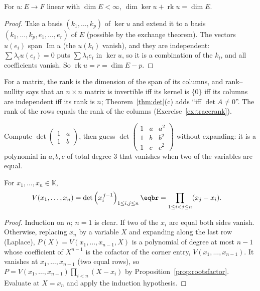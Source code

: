 \begin{proposition}\label{prop:ranknullity}
For $u:E\to F$ linear with $\dim E<\infty$, $\dim\ker u+\operatorname{rk}u=\dim E$.
\end{proposition}
\begin{proof}
Take a basis $(k_1,\dots,k_p)$ of $\ker u$ and extend it to a basis $(k_1,\dots,k_p,e_1,\dots,e_r)$ of $E$ (possible by the exchange theorem). The vectors $u(e_i)$ span $\operatorname{Im}u$ (the $u(k_i)$ vanish), and they are independent: $\sum\lambda_iu(e_i)=0$ puts $\sum\lambda_ie_i$ in $\ker u$, so it is a combination of the $k_i$, and all coefficients vanish. So $\operatorname{rk}u=r=\dim E-p$.
\end{proof}

For a matrix, the rank is the dimension of the span of its columns, and rank--nullity says that an $n\times n$ matrix is invertible iff its kernel is $\{0\}$ iff its columns are independent iff its rank is $n$; Theorem~\ref{thm:det}(c) adds ``iff $\det A\ne0$''. The rank of the rows equals the rank of the columns (Exercise~\ref{ex:tracerank}).

\begin{think}
Compute $\det\begin{pmatrix}1&a\\1&b\end{pmatrix}$, then guess $\det\begin{pmatrix}1&a&a^2\\1&b&b^2\\1&c&c^2\end{pmatrix}$ without expanding: it is a polynomial in $a,b,c$ of total degree $3$ that vanishes when two of the variables are equal.
\end{think}

\begin{proposition}[Vandermonde]\label{prop:vdm}
For $x_1,\dots,x_n\in\mathbb K$,
\[
\begin{aligned}V(x_1,\dots,x_n)&=\det\left(x_i^{\,j-1}\right)_{1\le i,j\le n}\eqbr=\prod_{1\le i<j\le n}(x_j-x_i).\end{aligned}
\]
\end{proposition}
\begin{proof}
Induction on $n$; $n=1$ is clear. If two of the $x_i$ are equal both sides vanish. Otherwise, replacing $x_n$ by a variable $X$ and expanding along the last row (Laplace),
$P(X)=V(x_1,\dots,x_{n-1},X)$ is a polynomial of degree at most $n-1$ whose coefficient of $X^{n-1}$ is the cofactor of the corner entry, $V(x_1,\dots,x_{n-1})$. It vanishes at $x_1,\dots,x_{n-1}$ (two equal rows),
so $P=V(x_1,\dots,x_{n-1})\prod_{i<n}(X-x_i)$ by Proposition~\ref{prop:rootsfactor}. Evaluate at $X=x_n$ and apply the induction hypothesis.
\end{proof}

